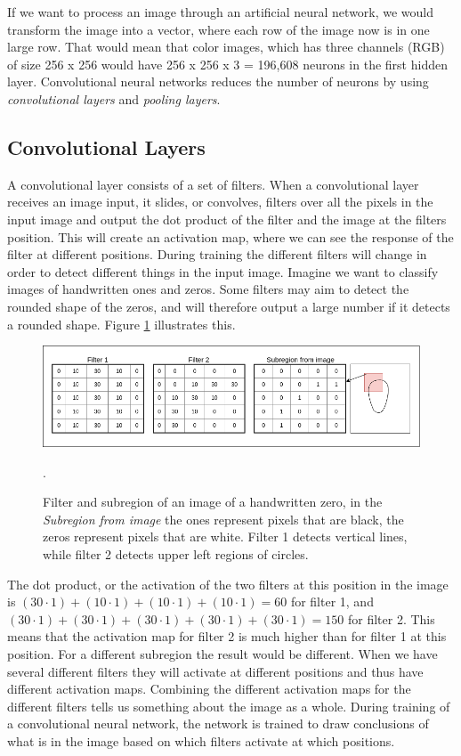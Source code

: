 \vspace{2mm}

\noindent
If we want to process an image through an artificial neural network, we would transform the image into a vector, where each row of the image now is in one large row. That would mean that color images, which has three channels (RGB) of size 256 x 256 would have 256 x 256 x 3 = 196,608 neurons in the first hidden layer. Convolutional neural networks reduces the number of neurons by using \textit{convolutional layers} and \textit{pooling layers}.

\subsection{Convolutional Layers}
\label{sec:conv}
 A convolutional layer consists of a set of filters. When a convolutional layer receives an image input, it slides, or convolves, filters over all the pixels in the input image and output the dot product of the filter and the image at the filters position. This will create an activation map, where we can see the response of the filter at different positions. During training the different filters will change in order to detect different things in the input image. Imagine we want to classify images of handwritten ones and zeros. Some filters may aim to detect the rounded shape of the zeros, and will therefore output a large number if it detects a rounded shape. Figure \ref{fig:filter_cnn} illustrates this. 
\begin{figure}[h!]
    \centering
    \includegraphics[scale=0.40]{fig/Filter_cnn.png}
    \caption{Filter and subregion of an image of a handwritten zero, in the \textit{Subregion from image} the ones represent pixels that are black, the zeros represent pixels that are white. Filter 1 detects vertical lines, while filter 2 detects upper left regions of circles. }
    \label{fig:filter_cnn}.
\end{figure}

\newpage

The dot product, or the activation of the two filters at this position in the image is $(30 \cdot 1) + (10 \cdot 1) + (10 \cdot 1) + (10 \cdot 1) = 60$ for filter 1, and $(30 \cdot 1) + (30 \cdot 1) + (30 \cdot 1) + (30 \cdot 1) + (30 \cdot 1) = 150$ for filter 2. This means that the activation map for filter 2 is much higher than for filter 1 at this position. For a different subregion the result would be different. When we have several different filters they will activate at different positions and thus have different activation maps. Combining the different activation maps for the different filters tells us something about the image as a whole. During training of a convolutional neural network, the network is trained to draw conclusions of what is in the image based on which filters activate at which positions. 

